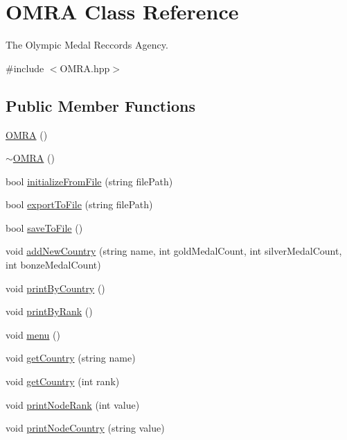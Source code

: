 \hypertarget{class_o_m_r_a}{}\section{O\+M\+R\+A Class Reference}
\label{class_o_m_r_a}


The Olympic Medal Reccords Agency.  




{\ttfamily \#include $<$O\+M\+R\+A.\+hpp$>$}

\subsection*{Public Member Functions}
\begin{DoxyCompactItemize}
\item 
\hyperlink{class_o_m_r_a_a51a43a1ebb04444f92e0d0d69b37608f}{O\+M\+R\+A} ()
\item 
\hyperlink{class_o_m_r_a_a95811f45de493f501490e172f81afceb}{$\sim$\+O\+M\+R\+A} ()
\item 
bool \hyperlink{class_o_m_r_a_a835f3ae164e81d8330f464c51acde0e7}{initialize\+From\+File} (string file\+Path)
\item 
bool \hyperlink{class_o_m_r_a_a23fa6ae1e38ca83b6ccc7bbf58835e33}{export\+To\+File} (string file\+Path)
\item 
bool \hyperlink{class_o_m_r_a_a5318026415aaac1e158f02e1551d1d20}{save\+To\+File} ()
\item 
void \hyperlink{class_o_m_r_a_a01116300132644a7f88e84c49e146dfd}{add\+New\+Country} (string name, int gold\+Medal\+Count, int silver\+Medal\+Count, int bonze\+Medal\+Count)
\item 
void \hyperlink{class_o_m_r_a_a444dcb0f6f8f2c383571af922a4b22f3}{print\+By\+Country} ()
\item 
void \hyperlink{class_o_m_r_a_a9121efbdba80799aaf0f8e4dc5c17699}{print\+By\+Rank} ()
\item 
void \hyperlink{class_o_m_r_a_a9acdcf3bc4c384fbe4e91654ffa20e0c}{menu} ()
\item 
void \hyperlink{class_o_m_r_a_a001516439822b057183c6c296feae136}{get\+Country} (string name)
\item 
void \hyperlink{class_o_m_r_a_a47cbde06653c5cdab3f79c510a63c83a}{get\+Country} (int rank)
\item 
void \hyperlink{class_o_m_r_a_a30efbe8adda53dd2fb745d627025b6a3}{print\+Node\+Rank} (int value)
\item 
void \hyperlink{class_o_m_r_a_ad0dd927db3177ecd7c43da76778fbcd9}{print\+Node\+Country} (string value)

\end{DoxyCompactItemize}
